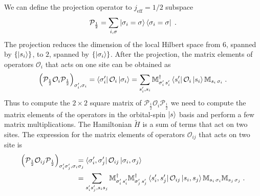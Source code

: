 We can define the projection operator to $j_{\text{eff}}=1/2$ subspace
\begin{equation}
    \mathcal{P}_{\frac{1}{2}} =
    \sum_{i, \sigma} \ket{\sigma_i = \sigma}\bra{\sigma_i = \sigma} \; .
\end{equation}
The projection reduces the dimension of the local Hilbert space from $6$, spanned by $\{\ket{s_i}\}$, to $2$, spanned by $\{\ket{\sigma_i}\}$.
After the projection, the matrix elements of operators $\mathcal{O}_i$ that acts on one site can be obtained as
\begin{equation}
   \Big(\mathcal{P}_{\frac{1}{2}} \mathcal{O}_{i} \mathcal{P}_{\frac{1}{2}} \Big)_{\sigma_i',\sigma_i}
   = \bra{\sigma_i'}   \mathcal{O}_{i}   \ket{\sigma_i}
   = \sum_{s_i',s_i}  \mathbb{M}_{\sigma_i' \, s_i'}^\dagger   \bra{s_i'}   \mathcal{O}_{i}   \ket{s_i} \mathbb{M}_{s_i\, \sigma_i}
   \; .
\end{equation}
Thus to compute the $2\times2$ square matrix of $\mathcal{P}_{\frac{1}{2}} \mathcal{O}_{i} \mathcal{P}_{\frac{1}{2}}$ we need to compute the matrix elements of the operators in the orbital-spin $\ket{s}$ basis and perform a few matrix multiplications.
The Hamiltonian $\tilde{H}$ is a sum of terms that act on two sites. The expression for the matrix elements of operators $\mathcal{O}_{ij}$ that acts on two site is
\begin{equation}
\begin{split}
       \Big(\mathcal{P}_{\frac{1}{2}} \mathcal{O}_{ij} \mathcal{P}_{\frac{1}{2}} \Big)_{\sigma_i'\sigma_j',\sigma_i\sigma_j}\hspace*{-4mm}
   &= \bra{\sigma_i',\sigma_j'}   \mathcal{O}_{ij}   \ket{\sigma_i,\sigma_j} \\
   &= \sum_{s_i's_j',s_is_j}  \mathbb{M}_{\sigma_i' \, s_i'}^\dagger   \mathbb{M}_{\sigma_j' \, s_j'}^\dagger   \bra{s_i',s_j'}   \mathcal{O}_{ij}   \ket{s_i,s_j} \mathbb{M}_{s_i\, \sigma_i} \mathbb{M}_{s_j\, \sigma_j}
   \; . \label{eq:oij}
\end{split}
\end{equation}



